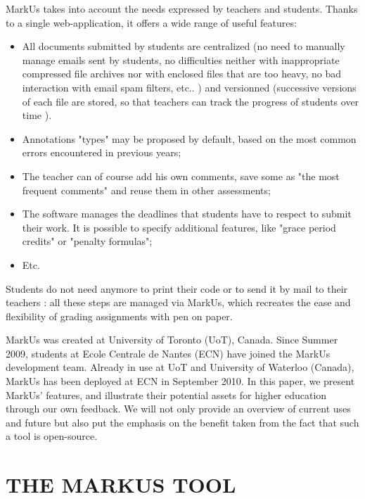 \documentclass[twocolumn,10pt]{asme2e}
\begin{document}
MarkUs takes into account the needs expressed by teachers and students. Thanks to a single web-application, it offers a wide range of useful features: 
\begin{itemize}
\item All documents submitted by students are centralized (no need to manually manage emails sent by students, no difficulties neither with inappropriate compressed file archives nor with enclosed files that are too heavy, no bad interaction with email spam filters, etc.. ) and versionned (successive versions of each file are stored, so that teachers can track the progress of students over time \cite{Reid05learningby}).
\item Annotations "types" may be proposed by default, based on the most common errors encountered in previous years;
\item The teacher can of course add his own comments, save some as "the most frequent comments" and reuse them in other assessments; 
\item The software manages the deadlines that students have to respect to submit their work. It is possible to specify additional features, like "grace period credits" or "penalty formulas";
\item Etc.
\end{itemize}

Students do not need anymore to print their code or to send it by mail to their teachers : all these steps are managed via MarkUs, which recreates the ease and flexibility of grading assignments with pen on paper. 

MarkUs was created at University of Toronto (UoT), Canada. Since Summer 2009, students at Ecole Centrale de Nantes (ECN) have joined the MarkUs development team. Already in use at UoT and University of Waterloo (Canada), MarkUs has been deployed at ECN in September 2010. In this paper, we present MarkUs' features, and illustrate their potential assets for higher education through our own feedback. We will not only provide an overview of current uses and future but also put the emphasis on the benefit taken from the fact that such a tool is open-source. 



\section*{THE MARKUS TOOL}

\end{document}
